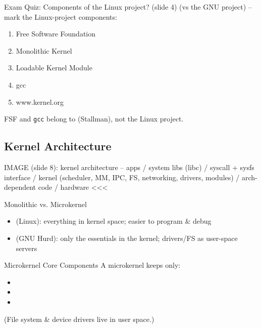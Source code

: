 \begin{example2}{Exam Quiz: Components of the Linux project? (slide 4)}
    (vs the GNU project) -- mark the Linux-project components:
    \begin{enumerate}
        \item Free Software Foundation
        \item Monolithic Kernel
        \item Loadable Kernel Module
        \item gcc
        \item www.kernel.org
    \end{enumerate}
    \tcblower
    FSF and \texttt{gcc} belong to  (Stallman), not the Linux project.
\end{example2}

\subsection{Kernel Architecture}

IMAGE (slide 8): kernel architecture -- apps / system libs (libc) / syscall + sysfs interface / kernel (scheduler, MM, IPC, FS, networking, drivers, modules) / arch-dependent code / hardware <<<


\begin{concept}{Monolithic vs. Microkernel}
    \begin{itemize}
        \item {} (Linux): everything in kernel space; easier to
              program \& debug
        \item {} (GNU Hurd): only the essentials in the kernel;
              drivers/FS as user-space servers
    \end{itemize}
\end{concept}

\begin{corollary}{Microkernel Core Components}
    A microkernel keeps only:
    \begin{itemize}
        \item {}
        \item {}
        \item {}
    \end{itemize}
    (File system \& device drivers live in user space.)
\end{corollary}

